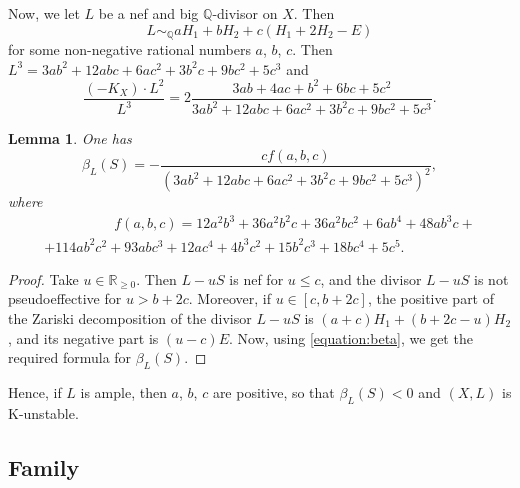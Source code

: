 \documentclass[12pt]{amsart}
\newtheorem{lemma}[theorem]{Lemma}
\theoremstyle{definition}
\theoremstyle{remark}
\begin{document}
Now, we let $L$ be a nef and big $\mathbb{Q}$-divisor on $X$. Then
$$
L\sim_{\mathbb{Q}} aH_1+bH_2+c(H_1+2H_2-E)
$$
for some non-negative rational numbers $a$, $b$, $c$. Then $L^3=3ab^2+12abc+6ac^2+3b^2c+9bc^2+5c^3$ and
$$
\frac{(-K_X)\cdot L^{2}}{L^3}=2\frac{3ab+4ac+b^2+6bc+5c^2}{3ab^2+12abc+6ac^2+3b^2c+9bc^2+5c^3}.
$$

\begin{lemma}
\label{lemma:3-21}
One has
$$
\beta_{L}(S)=-\frac{cf(a,b,c)}{(3ab^2+12abc+6ac^2+3b^2c+9bc^2+ 5c^3)^2},
$$
where
\begin{multline*}
\quad\quad \quad \quad \quad  f(a,b,c)=12a^2b^3+36a^2b^2c+36a^2bc^2+6ab^4+48ab^3c+\\
+114ab^2c^2+93abc^3+12ac^4+4b^3c^2+15b^2c^3+18bc^4+5c^5.\quad \quad \quad \quad
\end{multline*}
\end{lemma}

\begin{proof}
Take $u\in\mathbb{R}_{\geqslant 0}$. Then $L-uS$ is nef for $u\leqslant c$, and the divisor $L-uS$ is not pseudoeffective for $u>b+2c$. Moreover, if $u\in[c,b+2c]$, the positive part of the Zariski decomposition of the divisor $L-uS$ is $(a+c)H_1+(b+2c-u)H_2$, and its negative part is $(u-c)E$. Now, using \eqref{equation:beta}, we get the required formula for $\beta_L(S)$.
\end{proof}

Hence, if $L$ is ample, then $a$, $b$, $c$ are positive, so that $\beta_{L}(S)<0$ and $(X,L)$ is K-unstable.


\subsection{Family }
\label{subsection:3-22}
\end{document}
